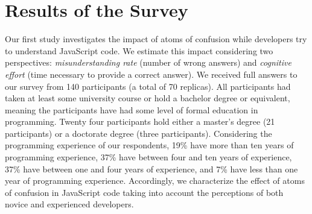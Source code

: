 

\section{Results of the Survey}
\label{sec:survey-resuts} 

Our first study investigates the impact of atoms of confusion while developers try to understand JavaScript code.
We estimate this impact considering two perspectives: \emph{misunderstanding rate} (number of wrong answers)
and \emph{cognitive effort} (time necessary to provide a correct answer). 
We received full answers to our survey from 140 participants (a total of 70 replicas).
All participants had taken at least some university course or hold a bachelor
degree or equivalent, meaning the participants have had some level of formal education in programming. Twenty four participants hold either a master's degree (21 participants) or a doctorate degree (three participants). 
Considering the programming experience of our respondents, 19\% have more than ten years of programming experience, 37\% have between four and ten years of experience, 37\% have between one and four years of experience, and 7\% have less than one year of programming experience.  
Accordingly, we characterize the effect of atoms of confusion in JavaScript
code taking into account the perceptions of both novice and experienced developers. 





